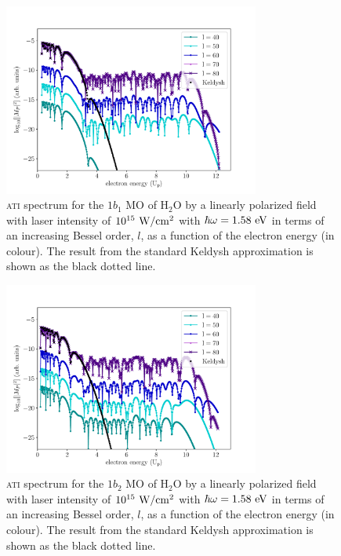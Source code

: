 \begin{figure}
  \centering
  \includegraphics[width=0.75\textwidth]
                  {figures/ch_ATI_SFA/1b1/l40to80n512WP50PG25MR35vsKeldysh.pdf}
  \caption{\textsc{ati} spectrum for the $1b_{1}$ MO of H$_{2}$O by a
    linearly polarized field with laser intensity of
    $10^{15}\ \rm{W/cm^{2}}$ with $\hbar\omega = 1.58\ \rm{eV}$ in
    terms of an increasing Bessel order, $l$, as a function of the
    electron energy (in colour). The result from the standard Keldysh
    approximation is shown as the black dotted line.}
  \label{fig:1b1_spectrum}
\end{figure}

\begin{figure}
  \centering
  \includegraphics[width=0.75\textwidth]
                  {figures/ch_ATI_SFA/1b2/l40to80n512WP50PG25MR35vsKeldysh.pdf}
  \caption{\textsc{ati} spectrum for the $1b_{2}$ MO of H$_{2}$O by a
    linearly polarized field with laser intensity of
    $10^{15}\ \rm{W/cm^{2}}$ with $\hbar\omega = 1.58\ \rm{eV}$ in
    terms of an increasing Bessel order, $l$, as a function of the
    electron energy (in colour). The result from the standard Keldysh
    approximation is shown as the black dotted line.}
  \label{fig:1b2_spectrum}
\end{figure}





